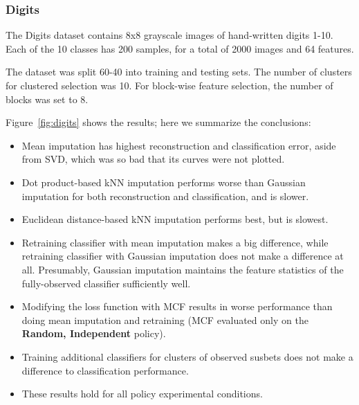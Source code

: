 \subsubsection{Digits}
The Digits dataset contains 8x8 grayscale images of hand-written digits 1-10.
Each of the 10 classes has 200 samples, for a total of 2000 images and 64 features.

The dataset was split 60-40 into training and testing sets.
The number of clusters for clustered selection was 10.
For block-wise feature selection, the number of blocks was set to 8.

Figure~\ref{fig:digits} shows the results; here we summarize the conclusions:
\begin{itemize}
\item Mean imputation has highest reconstruction and classification error, aside from SVD, which was so bad that its curves were not plotted.
\item Dot product-based kNN imputation performs worse than Gaussian imputation for both reconstruction and classification, and is slower.
\item Euclidean distance-based kNN imputation performs best, but is slowest.
\item Retraining classifier with mean imputation makes a big difference, while retraining classifier with Gaussian imputation does not make a difference at all.
Presumably, Gaussian imputation maintains the feature statistics of the fully-observed classifier sufficiently well.
\item Modifying the loss function with MCF results in worse performance than doing mean imputation and retraining (MCF evaluated only on the \textbf{Random, Independent} policy).
\item Training additional classifiers for clusters of observed susbets does not make a difference to classification performance.
\item These results hold for all policy experimental conditions.
\end{itemize}

